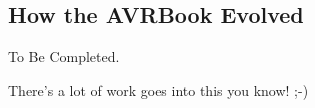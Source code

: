 \begin{appendix}

\chapter{How the AVRBook Evolved}
\label{appendix-a-how-it-was-done}%

To Be Completed.

There's a lot of work goes into this you know! ;-)


\end{appendix}
